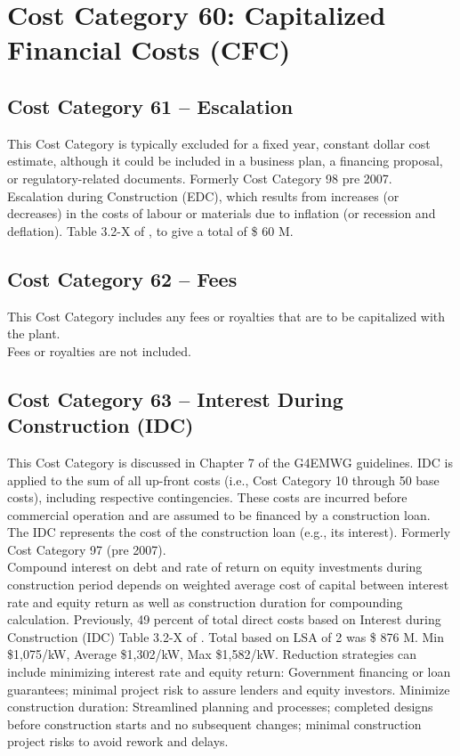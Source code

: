 \section{Cost Category 60: Capitalized Financial Costs (CFC)}

\subsection*{Cost Category 61 – Escalation}
This Cost Category is typically excluded for a fixed year, constant dollar cost estimate, although it could be included in a business plan, a financing proposal, or regulatory-related documents.  Formerly Cost Category 98 pre 2007.\\

Escalation during Construction (EDC), which results from increases (or decreases) in the costs of labour 
or materials due to inflation (or recession and deflation). Table 3.2-X of \cite{SCH78}, to give a total of \$ 60 M.

\subsection*{Cost Category 62 – Fees}
This Cost Category includes any fees or royalties that are to be capitalized with the plant.\\

Fees or royalties are not included.

\subsection*{Cost Category 63 – Interest During Construction (IDC)}
This Cost Category is discussed in Chapter 7 of the G4EMWG guidelines. IDC is applied to the sum of all up-front costs (i.e., Cost Category 10 through 50 base costs), including respective contingencies. These costs are incurred before commercial operation and are assumed to be financed by a construction loan. The IDC represents the cost of the construction loan (e.g., its interest). Formerly Cost Category 97 (pre 2007).\\

Compound interest on debt and rate of return on equity investments during construction 
period depends on weighted average cost of capital between interest rate and equity  return as well as construction duration for compounding calculation. Previously,  49 percent of total direct costs based on Interest during Construction (IDC) Table 3.2-X of \cite{SCH78}.  Total based on LSA of 2 was \$ 876 M. Min \$1,075/kW, Average \$1,302/kW, Max \$1,582/kW. Reduction strategies can include minimizing interest rate and equity return: Government financing or loan guarantees; minimal project risk to assure lenders and equity investors. Minimize construction duration:  Streamlined planning and processes; completed designs before construction starts and no subsequent  changes; minimal construction project risks to avoid rework and delays.\\

